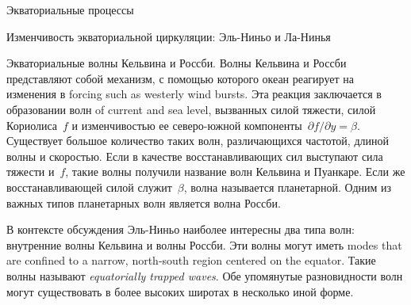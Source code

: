 \begin{chapter}{Экваториальные процессы}
\begin{section}{Изменчивость экваториальной циркуляции: Эль-Ниньо и Ла-Нинья}
\begin{paragraph}{Экваториальные волны Кельвина и Россби.}
Волны Кельвина и Россби представляют собой механизм,
с помощью которого океан реагирует на изменения в forcing such as westerly 
wind bursts. Эта реакция заключается в образовании волн of current and 
sea level, вызванных силой тяжести, силой Кориолиса~$f$ и изменчивостью ее
северо-южной компоненты~$\partial f/\partial y = \beta$. Существует большое
количество таких волн, различающихся частотой, длиной волны и скоростью.
Если в качестве восстанавливающих сил выступают сила тяжести и~$f$, такие
волны получили название волн Кельвина и Пуанкаре. Если же восстанавливающей
силой служит~$\beta$, волна называется планетарной. Одним из важных типов
планетарных волн является волна Россби.
%

В контексте обсуждения Эль-Ниньо наиболее интересны два типа волн:
внутренние волны Кельвина и волны 
Россби. Эти волны могут иметь modes that are confined 
to a narrow, north-south region centered on the equator. 
Такие волны называют 
\textit{equatorially trapped waves}. 
Обе упомянутые разновидности волн могут существовать в более высоких широтах
в несколько иной форме.
%


\end{paragraph}
\end{section}
\end{chapter}
